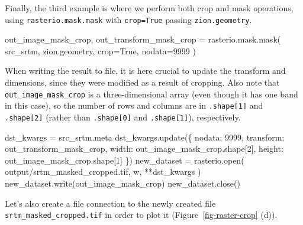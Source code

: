 \documentclass[
  letterpaper,
]{krantz}
\newenvironment{Shaded}{\begin{snugshade}}{\end{snugshade}}
\newcommand{\BuiltInTok}[1]{\textcolor[rgb]{0.00,0.23,0.31}{#1}}
\newcommand{\DecValTok}[1]{\textcolor[rgb]{0.68,0.00,0.00}{#1}}
\newcommand{\NormalTok}[1]{\textcolor[rgb]{0.00,0.23,0.31}{#1}}
\newcommand{\OperatorTok}[1]{\textcolor[rgb]{0.37,0.37,0.37}{#1}}
\newcommand{\StringTok}[1]{\textcolor[rgb]{0.13,0.47,0.30}{#1}}
\newcommand{\VariableTok}[1]{\textcolor[rgb]{0.07,0.07,0.07}{#1}}
\begin{document}
Finally, the third example is where we perform both crop and mask
operations, using \texttt{rasterio.mask.mask} with \texttt{crop=True}
passing \texttt{zion.geometry}.

\begin{Shaded}
\begin{Highlighting}[]
\NormalTok{out\_image\_mask\_crop, out\_transform\_mask\_crop }\OperatorTok{=}\NormalTok{ rasterio.mask.mask(}
\NormalTok{    src\_srtm, }
\NormalTok{    zion.geometry, }
\NormalTok{    crop}\OperatorTok{=}\VariableTok{True}\NormalTok{, }
\NormalTok{    nodata}\OperatorTok{=}\DecValTok{9999}
\NormalTok{)}
\end{Highlighting}
\end{Shaded}

When writing the result to file, it is here crucial to update the
transform and dimensions, since they were modified as a result of
cropping. Also note that \texttt{out\_image\_mask\_crop} is a
three-dimensional array (even though it has one band in this case), so
the number of rows and columns are in \texttt{.shape{[}1{]}} and
\texttt{.shape{[}2{]}} (rather than \texttt{.shape{[}0{]}} and
\texttt{.shape{[}1{]}}), respectively.

\begin{Shaded}
\begin{Highlighting}[]
\NormalTok{dst\_kwargs }\OperatorTok{=}\NormalTok{ src\_srtm.meta}
\NormalTok{dst\_kwargs.update(\{}
    \StringTok{\textquotesingle{}nodata\textquotesingle{}}\NormalTok{: }\DecValTok{9999}\NormalTok{,}
    \StringTok{\textquotesingle{}transform\textquotesingle{}}\NormalTok{: out\_transform\_mask\_crop,}
    \StringTok{\textquotesingle{}width\textquotesingle{}}\NormalTok{: out\_image\_mask\_crop.shape[}\DecValTok{2}\NormalTok{],}
    \StringTok{\textquotesingle{}height\textquotesingle{}}\NormalTok{: out\_image\_mask\_crop.shape[}\DecValTok{1}\NormalTok{]}
\NormalTok{\})}
\NormalTok{new\_dataset }\OperatorTok{=}\NormalTok{ rasterio.}\BuiltInTok{open}\NormalTok{(}
    \StringTok{\textquotesingle{}output/srtm\_masked\_cropped.tif\textquotesingle{}}\NormalTok{, }
    \StringTok{\textquotesingle{}w\textquotesingle{}}\NormalTok{, }
    \OperatorTok{**}\NormalTok{dst\_kwargs}
\NormalTok{)}
\NormalTok{new\_dataset.write(out\_image\_mask\_crop)}
\NormalTok{new\_dataset.close()}
\end{Highlighting}
\end{Shaded}

Let's also create a file connection to the newly created file
\texttt{srtm\_masked\_cropped.tif} in order to plot it
(Figure~\ref{fig-raster-crop} (d)).
\end{document}
